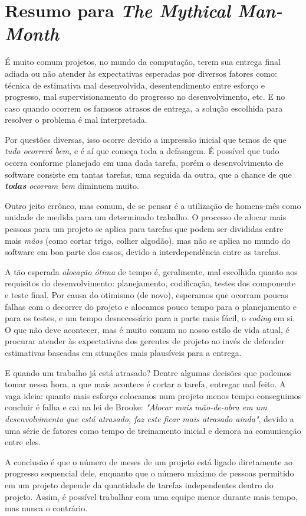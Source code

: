 \documentclass[a4paper,12pt]{article}
\begin{document}
\section*{Resumo para \emph{The Mythical Man-Month}}

É muito comum projetos, no mundo da computação, terem sua entrega final adiada ou não atender às expectativas esperadas por diversos fatores como: técnica de estimativa mal desenvolvida, desentendimento entre esforço e progresso, mal supervisionamento do progresso no desenvolvimento, etc. E no caso quando ocorrem os famosos atrasos de entrega, a solução escolhida para resolver o problema é mal interpretada.

Por questões diversas, isso ocorre devido a impressão inicial que temos de que \emph{tudo ocorrerá bem}, e é aí que começa toda a defasagem. É possível que tudo ocorra conforme planejado em uma dada tarefa, porém o desenvolvimento de software consiste em tantas tarefas, uma seguida da outra, que a chance de que \emph{\textbf{todas} ocorram bem} diminuem muito.

Outro jeito errôneo, mas comum, de se pensar é a utilização de homens-mês como unidade de medida para um determinado trabalho. O processo de alocar mais pessoas para um projeto se aplica para tarefas que podem ser divididas entre mais \emph{mãos} (como cortar trigo, colher algodão), mas não se aplica no mundo do software em boa parte dos casos, devido a interdependência entre as tarefas.

A tão esperada \emph{alocação ótima} de tempo é, geralmente, mal escolhida quanto aos requisitos do desenvolvimento: planejamento, codificação, testes dos componente e teste final. Por causa do otimismo (de novo), esperamos que ocorram poucas falhas com o decorrer do projeto e alocamos pouco tempo para o planejamento e para os testes, e um tempo desnecessário para a parte mais fácil, o \emph{coding} em si. O que não deve acontecer, mas é muito comum no nosso estilo de vida atual, é procurar atender às expectativas dos gerentes de projeto ao invés de defender estimativas baseadas em situações mais plausíveis para a entrega.

E quando um trabalho já está atrasado? Dentre algumas decisões que podemos tomar nessa hora, a que mais acontece é cortar a tarefa, entregar mal feito. A vaga ideia: quanto mais esforço colocamos num projeto menos tempo conseguimos concluir é falha e cai na lei de Brooke: \emph{"Alocar mais mão-de-obra em um desenvolvimento que está atrasado, faz este ficar mais atrasado ainda"}, devido a uma série de fatores como tempo de treinamento inicial e demora na comunicação entre eles.

A conclusão é que o número de meses de um projeto está ligado diretamente ao progresso sequencial dele, enquanto que o número máximo de pessoas permitido em um projeto depende da quantidade de tarefas independentes dentro do projeto. Assim, é possível trabalhar com uma equipe menor durante mais tempo, mas nunca o contrário.
\end{document}

